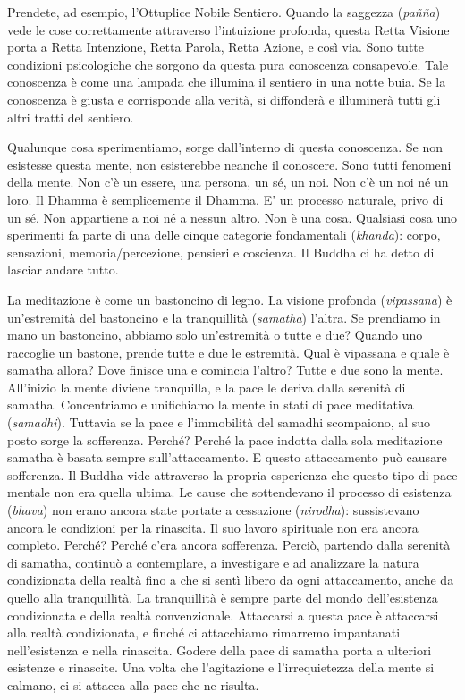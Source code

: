 Prendete, ad esempio, l'Ottuplice Nobile Sentiero. Quando la saggezza
(\emph{pañña}) vede le cose correttamente attraverso l'intuizione
profonda, questa Retta Visione porta a Retta Intenzione, Retta Parola,
Retta Azione, e così via. Sono tutte condizioni psicologiche che sorgono
da questa pura conoscenza consapevole. Tale conoscenza è come una
lampada che illumina il sentiero in una notte buia. Se la conoscenza è
giusta e corrisponde alla verità, si diffonderà e illuminerà tutti gli
altri tratti del sentiero.

Qualunque cosa sperimentiamo, sorge dall'interno di questa conoscenza.
Se non esistesse questa mente, non esisterebbe neanche il conoscere.
Sono tutti fenomeni della mente. Non c'è un essere, una persona, un sé,
un noi. Non c'è un noi né un loro. Il Dhamma è semplicemente il Dhamma.
E' un processo naturale, privo di un sé. Non appartiene a noi né a
nessun altro. Non è una cosa. Qualsiasi cosa uno sperimenti fa parte di
una delle cinque categorie fondamentali (\emph{khanda}): corpo,
sensazioni, memoria/percezione, pensieri e coscienza. Il Buddha ci ha
detto di lasciar andare tutto.

La meditazione è come un bastoncino di legno. La visione profonda
(\emph{vipassana}) è un'estremità del bastoncino e la tranquillità
(\emph{samatha}) l'altra. Se prendiamo in mano un bastoncino, abbiamo
solo un'estremità o tutte e due? Quando uno raccoglie un bastone, prende
tutte e due le estremità. Qual è vipassana e quale è samatha allora?
Dove finisce una e comincia l'altro? Tutte e due sono la mente.
All'inizio la mente diviene tranquilla, e la pace le deriva dalla
serenità di samatha. Concentriamo e unifichiamo la mente in stati di
pace meditativa (\emph{samadhi}). Tuttavia se la pace e l'immobilità del
samadhi scompaiono, al suo posto sorge la sofferenza. Perché? Perché la
pace indotta dalla sola meditazione samatha è basata sempre
sull'attaccamento. E questo attaccamento può causare sofferenza. Il
Buddha vide attraverso la propria esperienza che questo tipo di pace
mentale non era quella ultima. Le cause che sottendevano il processo di
esistenza (\emph{bhava}) non erano ancora state portate a cessazione
(\emph{nirodha}): sussistevano ancora le condizioni per la rinascita. Il
suo lavoro spirituale non era ancora completo. Perché? Perché c'era
ancora sofferenza. Perciò, partendo dalla serenità di samatha, continuò
a contemplare, a investigare e ad analizzare la natura condizionata
della realtà fino a che si sentì libero da ogni attaccamento, anche da
quello alla tranquillità. La tranquillità è sempre parte del mondo
dell'esistenza condizionata e della realtà convenzionale. Attaccarsi a
questa pace è attaccarsi alla realtà condizionata, e finché ci
attacchiamo rimarremo impantanati nell'esistenza e nella rinascita.
Godere della pace di samatha porta a ulteriori esistenze e rinascite.
Una volta che l'agitazione e l'irrequietezza della mente si calmano, ci
si attacca alla pace che ne risulta.

